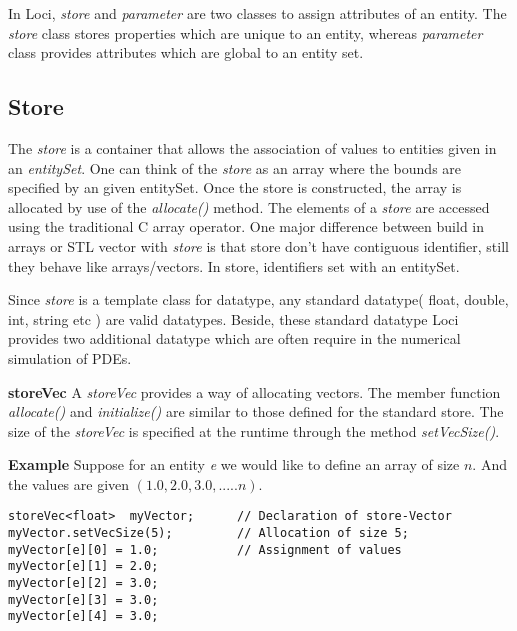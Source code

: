 \par In Loci, {\em store} and {\em parameter} are two classes to assign
attributes of an entity. The {\em store } class stores properties which
are unique to an entity, whereas {\em parameter} class provides attributes
which are global to an entity set.

\subsection{Store}
The {\em store} is a container that allows the association of values
to entities given in an {\em entitySet}.  One can think of the {\em
store} as an array where the bounds are specified by an given
entitySet.  Once the store is constructed, the array is allocated by
use of the {\em allocate() } method. The elements of a {\em store} are 
accessed using the traditional C array operator. One major difference
between build in arrays or STL vector with {\em store }  is that
store don't have contiguous identifier, still they behave like arrays/vectors. 
In store, identifiers set with an entitySet. 

\par Since {\em store} is a template class for datatype, any standard datatype( 
float, double, int, string etc ) are valid datatypes. Beside, these standard datatype
Loci provides two additional datatype which are often require in the numerical simulation
of PDEs.

\par {\bf storeVec } A {\em storeVec} provides a way of allocating vectors. The member 
function {\em allocate()} and {\em initialize()} are similar to those 
defined for the standard store. The size of the {\em storeVec} is
specified at the runtime through the method {\em setVecSize()}.
\par {\bf Example} Suppose for an entity {\em e} we would like to define an array
of size ${n}$. And the values are given $(1.0,2.0,3.0,.....n)$. 
\begin{verbatim}
storeVec<float>  myVector;      // Declaration of store-Vector
myVector.setVecSize(5);         // Allocation of size 5;
myVector[e][0] = 1.0;           // Assignment of values 
myVector[e][1] = 2.0;
myVector[e][2] = 3.0;
myVector[e][3] = 3.0;
myVector[e][4] = 3.0;
\end{verbatim}

